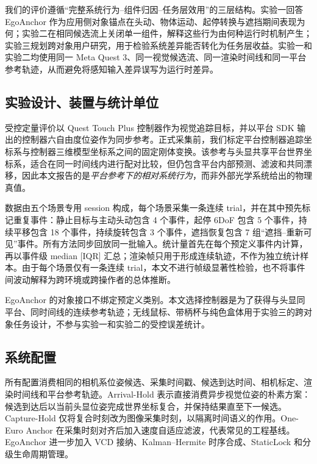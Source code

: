 \documentclass[review]{vgtc}
\begin{document}
我们的评价遵循“完整系统行为--组件归因--任务层效用”的三层结构。实验一回答 EgoAnchor 作为应用侧对象锚点在头动、物体运动、起停转换与遮挡期间表现为何；实验二在相同候选流上关闭单一组件，解释这些行为由何种运行时机制产生；实验三规划跨对象用户研究，用于检验系统差异能否转化为任务层收益。实验一和实验二均使用同一 Meta Quest 3、同一视觉候选流、同一渲染时间线和同一平台参考轨迹，从而避免将感知输入差异误写为运行时差异。

\subsection{实验设计、装置与统计单位}

受控定量评价以 Quest Touch Plus 控制器作为视觉追踪目标，并以平台 SDK 输出的控制器六自由度位姿作为同步参考。正式采集前，我们标定平台控制器追踪坐标系与控制器三维模型坐标系之间的固定刚体变换。该参考与头显共享平台世界坐标系，适合在同一时间线内进行配对比较，但仍包含平台内部预测、滤波和共同漂移，因此本文报告的是\emph{平台参考下的相对系统行为}，而非外部光学系统给出的物理真值。

数据由五个场景专用 session 构成，每个场景采集一条连续 trial，并在其中预先标记重复事件：静止目标与主动头动包含 4 个事件，起停 6DoF 包含 5 个事件，持续平移包含 18 个事件，持续旋转包含 3 个事件，遮挡恢复包含 7 组“遮挡--重新可见”事件。所有方法同步回放同一批输入。统计量首先在每个预定义事件内计算，再以事件级 median [IQR] 汇总；渲染帧只用于形成连续轨迹，不作为独立统计样本。由于每个场景仅有一条连续 trial，本文不进行帧级显著性检验，也不将事件间波动解释为跨环境或跨操作者的总体推断。

EgoAnchor 的对象接口不绑定预定义类别。本文选择控制器是为了获得与头显同平台、同时间线的连续参考轨迹；无线鼠标、带柄杯与纯色盒体用于实验三的跨对象任务设计，不参与实验一和实验二的受控误差统计。

\subsection{系统配置}

所有配置消费相同的相机系位姿候选、采集时间戳、候选到达时间、相机标定、渲染时间线和平台参考轨迹。Arrival-Hold 表示直接消费异步视觉位姿的朴素方案：候选到达后以当前头显位姿完成世界坐标复合，并保持结果直至下一候选。Capture-Hold 仅将复合时刻改为图像采集时刻，以隔离时间语义的作用。One-Euro Anchor 在采集时刻对齐后加入速度自适应滤波，代表常见的工程基线。EgoAnchor 进一步加入 VCD 接纳、Kalman--Hermite 时序合成、StaticLock 和分级生命周期管理。
\end{document}
